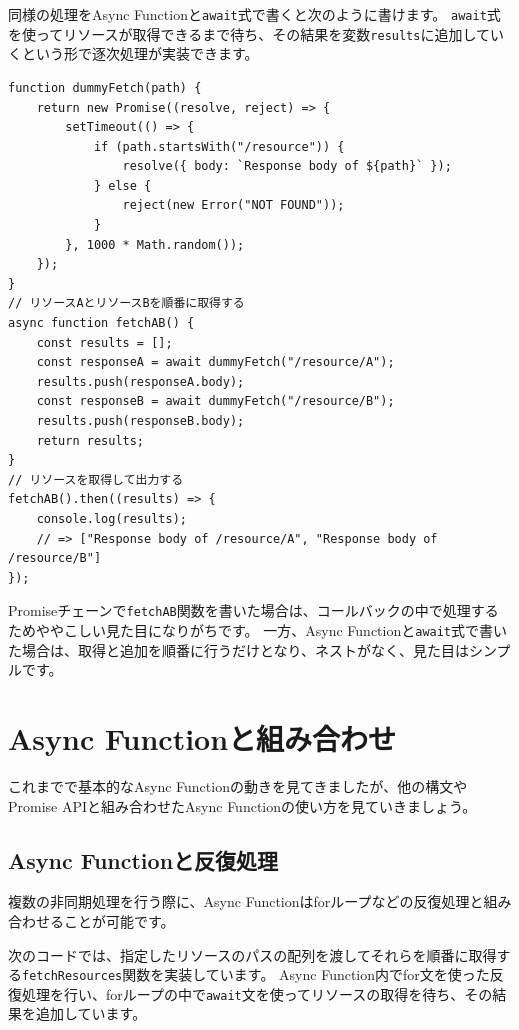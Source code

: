 同様の処理をAsync
Functionと\texttt{await}式で書くと次のように書けます。
\texttt{await}式を使ってリソースが取得できるまで待ち、その結果を変数\texttt{results}に追加していくという形で逐次処理が実装できます。

\begin{lstlisting}
function dummyFetch(path) {
    return new Promise((resolve, reject) => {
        setTimeout(() => {
            if (path.startsWith("/resource")) {
                resolve({ body: `Response body of ${path}` });
            } else {
                reject(new Error("NOT FOUND"));
            }
        }, 1000 * Math.random());
    });
}
// リソースAとリソースBを順番に取得する
async function fetchAB() {
    const results = [];
    const responseA = await dummyFetch("/resource/A");
    results.push(responseA.body);
    const responseB = await dummyFetch("/resource/B");
    results.push(responseB.body);
    return results;
}
// リソースを取得して出力する
fetchAB().then((results) => {
    console.log(results); 
    // => ["Response body of /resource/A", "Response body of /resource/B"]
});
\end{lstlisting}

Promiseチェーンで\texttt{fetchAB}関数を書いた場合は、コールバックの中で処理するためややこしい見た目になりがちです。
一方、Async
Functionと\texttt{await}式で書いた場合は、取得と追加を順番に行うだけとなり、ネストがなく、見た目はシンプルです。

\hypertarget{async-function-combination}{%
\section{Async Functionと組み合わせ}\label{async-function-combination}}

これまでで基本的なAsync
Functionの動きを見てきましたが、他の構文やPromise APIと組み合わせたAsync
Functionの使い方を見ていきましょう。

\hypertarget{async-function-array}{%
\subsection{Async Functionと反復処理}\label{async-function-array}}

複数の非同期処理を行う際に、Async
Functionはforループなどの反復処理と組み合わせることが可能です。

次のコードでは、指定したリソースのパスの配列を渡してそれらを順番に取得する\texttt{fetchResources}関数を実装しています。
Async
Function内でfor文を使った反復処理を行い、forループの中で\texttt{await}文を使ってリソースの取得を待ち、その結果を追加しています。

